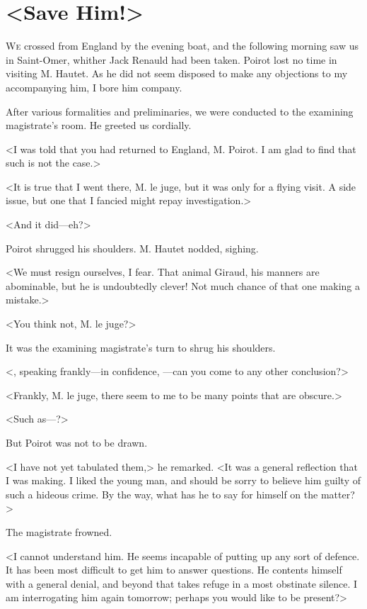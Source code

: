 \chapter{<Save Him!>}

\lettrine{W}{e} crossed from England by the evening boat, and the following morning saw us in Saint-Omer, whither Jack Renauld had been taken. Poirot lost no time in visiting M. Hautet. As he did not seem disposed to make any objections to my accompanying him, I bore him company. 

 After various formalities and preliminaries, we were conducted to the examining magistrate's room. He greeted us cordially. 

 <I was told that you had returned to England, M. Poirot. I am glad to find that such is not the case.> 

 <It is true that I went there, M. le juge, but it was only for a flying visit. A side issue, but one that I fancied might repay investigation.> 

 <And it did—eh?> 

 Poirot shrugged his shoulders. M. Hautet nodded, sighing. 

 <We must resign ourselves, I fear. That animal Giraud, his manners are abominable, but he is undoubtedly clever! Not much chance of that one making a mistake.> 

 <You think not, M. le juge?> 

 It was the examining magistrate's turn to shrug his shoulders. 

 <, speaking frankly—in confidence, —can you come to any other conclusion?> 

 <Frankly, M. le juge, there seem to me to be many points that are obscure.> 

 <Such as—?> 

 But Poirot was not to be drawn. 

 <I have not yet tabulated them,> he remarked. <It was a general reflection that I was making. I liked the young man, and should be sorry to believe him guilty of such a hideous crime. By the way, what has he to say for himself on the matter?> 

 The magistrate frowned. 

 <I cannot understand him. He seems incapable of putting up any sort of defence. It has been most difficult to get him to answer questions. He contents himself with a general denial, and beyond that takes refuge in a most obstinate silence. I am interrogating him again tomorrow; perhaps you would like to be present?> 

